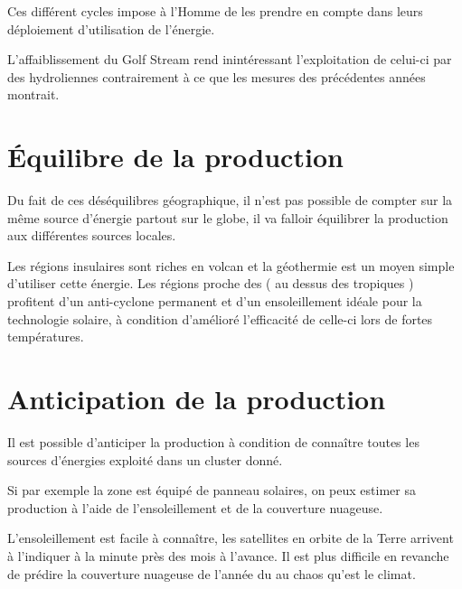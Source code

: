 Ces différent cycles impose à l'Homme de les prendre en compte dans leurs déploiement d'utilisation de l'énergie.

L'affaiblissement du Golf Stream rend inintéressant l'exploitation de celui-ci par des hydroliennes contrairement
à ce que les mesures des précédentes années montrait.


\section{Équilibre de la production}

Du fait de ces déséquilibres géographique, il n'est pas possible de compter sur la même source d'énergie partout
sur le globe, il va falloir équilibrer la production aux différentes sources locales.

Les régions insulaires sont riches en volcan et la géothermie est un moyen simple d'utiliser cette énergie.
Les régions proche des ( au dessus des tropiques ) profitent d'un anti-cyclone permanent et d'un ensoleillement
idéale pour la technologie solaire, à condition d'amélioré l'efficacité de celle-ci lors de fortes températures.

\section{Anticipation de la production}

Il est possible d'anticiper la production à condition de connaître toutes les sources d'énergies
exploité dans un cluster donné.

Si par exemple la zone est équipé de panneau solaires, on peux estimer sa production à l'aide de
l'ensoleillement et de la couverture nuageuse.

L'ensoleillement est facile à connaître, les satellites en orbite de la Terre arrivent à l'indiquer à la minute près
des mois à l'avance.
Il est plus difficile en revanche de prédire la couverture nuageuse de l'année du au chaos qu'est le climat.
